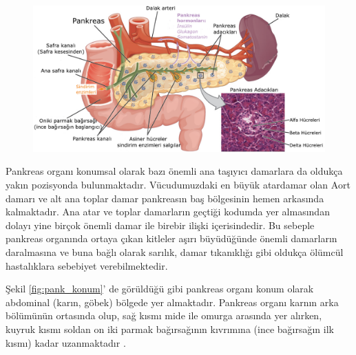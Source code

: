 \begin{figure}[h!]
	\begin{center}
		\vspace{0.4cm}
		{
			\vspace{0.4cm}
			\includegraphics[scale=0.52]{Genel-Bilgiler/Figures/pankreas.pdf}
		}
	\end{center}
\end{figure}

Pankreas organı konumsal olarak bazı önemli ana taşıyıcı damarlara da oldukça yakın pozisyonda bulunmaktadır. Vücudumuzdaki en büyük atardamar olan Aort damarı ve alt ana toplar damar pankreasın baş bölgesinin hemen arkasında kalmaktadır. Ana atar ve toplar damarların geçtiği kodumda yer almasından dolayı yine birçok önemli damar ile birebir ilişki içerisindedir. Bu sebeple pankreas organında ortaya çıkan kitleler aşırı büyüdüğünde önemli damarların daralmasına ve buna bağlı olarak sarılık, damar tıkanıklığı gibi oldukça ölümcül hastalıklara sebebiyet verebilmektedir.

Şekil \ref{fig:pank_konum}’ de görüldüğü gibi pankreas organı konum olarak abdominal (karın, göbek) bölgede yer almaktadır.  Pankreas organı karnın arka bölümünün ortasında olup, sağ kısmı mide ile omurga arasında yer alırken, kuyruk kısmı soldan on iki parmak bağırsağının kıvrımına (ince bağırsağın ilk kısmı) kadar uzanmaktadır \cite{bockman1993anatomy,skandalakis1993surgical}.

